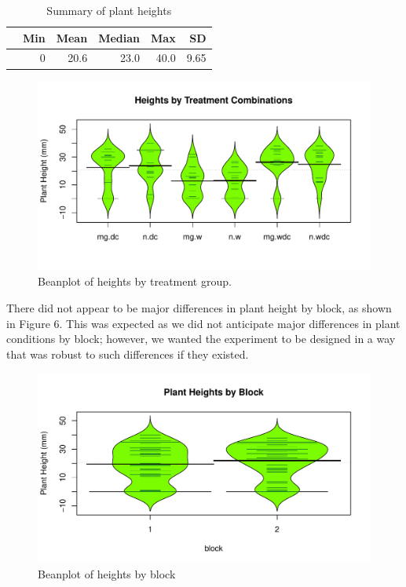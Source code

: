 \documentclass[1p,12pt]{elsarticle}\usepackage[]{graphicx}\usepackage[]{color}
\makeatletter
\def\maxwidth{ %
  \ifdim\Gin@nat@width>\linewidth
    \linewidth
  \else
    \Gin@nat@width
  \fi
}
\newenvironment{knitrout}{}{} %
\makeatother
\begin{document}
\begin{table}[ht]
\centering
\begin{tabular}{rrrrrr}
  \hline
 & Min & Mean & Median & Max & SD \\ 
  \hline
 & 0 & 20.6 & 23.0 & 40.0 & 9.65\\ 
  
   \hline
\end{tabular}
\caption{Summary of plant heights}
\end{table}

\begin{knitrout}
\color{fgcolor}\begin{figure}
\includegraphics[width=\maxwidth]{figure/eda-1} \caption[Beanplot of heights by treatment group]{Beanplot of heights by treatment group.}\label{fig:eda}
\end{figure}


\end{knitrout}

There did not appear to be major differences in plant height by block, as shown in Figure 6. This was expected as we did not anticipate major differences in plant conditions by block; however, we wanted the experiment to be designed in a way that was robust to such differences if they existed. 

\begin{knitrout}
\color{fgcolor}\begin{figure}
\includegraphics[width=\maxwidth]{figure/block_bean-1} \caption[Beanplot of heights by block]{Beanplot of heights by block}\label{fig:block_bean}
\end{figure}


\end{knitrout}
\end{document}
